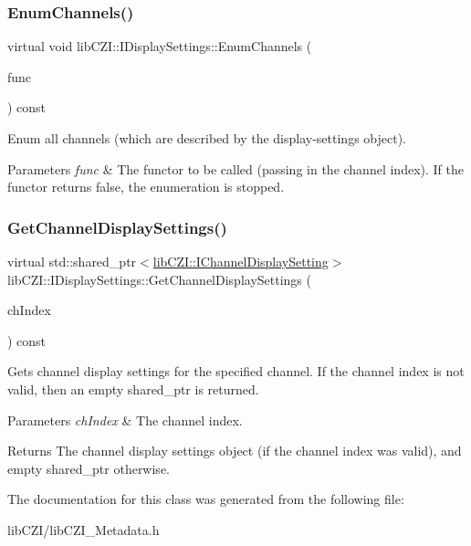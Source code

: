\subsubsection{\texorpdfstring{Enum\+Channels()}{EnumChannels()}}
{\footnotesize\ttfamily virtual void lib\+C\+Z\+I\+::\+I\+Display\+Settings\+::\+Enum\+Channels (\begin{DoxyParamCaption}\item[{std\+::function$<$ bool(int ch\+Index)$>$}]{func }\end{DoxyParamCaption}) const\hspace{0.3cm}{\ttfamily [pure virtual]}}

Enum all channels (which are described by the display-\/settings object).


\begin{DoxyParams}{Parameters}
{\em func} & The functor to be called (passing in the channel index). If the functor returns false, the enumeration is stopped. \\
\hline
\end{DoxyParams}
\mbox{\label{classlib_c_z_i_1_1_i_display_settings_ad67ab35e429286d38dd11245eda3dc4c}} 
\subsubsection{\texorpdfstring{Get\+Channel\+Display\+Settings()}{GetChannelDisplaySettings()}}
{\footnotesize\ttfamily virtual std\+::shared\+\_\+ptr$<$\hyperlink{classlib_c_z_i_1_1_i_channel_display_setting}{lib\+C\+Z\+I\+::\+I\+Channel\+Display\+Setting}$>$ lib\+C\+Z\+I\+::\+I\+Display\+Settings\+::\+Get\+Channel\+Display\+Settings (\begin{DoxyParamCaption}\item[{int}]{ch\+Index }\end{DoxyParamCaption}) const\hspace{0.3cm}{\ttfamily [pure virtual]}}

Gets channel display settings for the specified channel. If the channel index is not valid, then an empty shared\+\_\+ptr is returned.


\begin{DoxyParams}{Parameters}
{\em ch\+Index} & The channel index.\\
\hline
\end{DoxyParams}
\begin{DoxyReturn}{Returns}
The channel display settings object (if the channel index was valid), and empty shared\+\_\+ptr otherwise. 
\end{DoxyReturn}


The documentation for this class was generated from the following file\+:\begin{DoxyCompactItemize}
\item 
lib\+C\+Z\+I/lib\+C\+Z\+I\+\_\+\+Metadata.\+h\end{DoxyCompactItemize}
